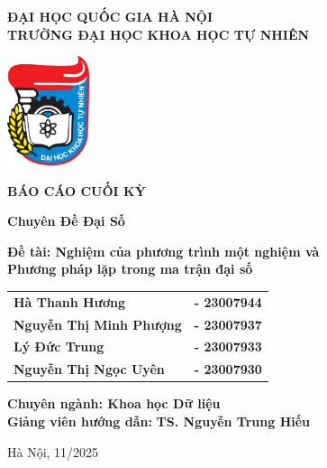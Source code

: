 \thispagestyle{empty}


\begin{center}
  \vspace{1.2cm}
  \textbf{ĐẠI HỌC QUỐC GIA HÀ NỘI} \\[0.2cm]
  \textbf{\fontsize{14pt}{17pt}\selectfont TRƯỜNG ĐẠI HỌC KHOA HỌC TỰ NHIÊN}

  \vspace{1.2cm}
  \includegraphics[width=0.18\textwidth]{figures/hus_logo.jpg}

  \vspace{1.2cm}
  {\bfseries\fontsize{35pt}{33pt}\selectfont BÁO CÁO CUỐI KỲ}

  \vspace{0.5cm}
  {\bfseries\fontsize{22pt}{26pt}\selectfont Chuyên Đề Đại Số}

  \vspace{0.8cm}
  \parbox{\dimexpr\textwidth - 1.2cm\relax}{
    \centering
    \textbf{\fontsize{18pt}{25pt}\selectfont
      Đề tài: Nghiệm của phương trình một nghiệm và\\
      Phương pháp lặp trong ma trận đại số}
  }

  \vspace{1.6cm}
  \renewcommand{\arraystretch}{1.2}
  \begin{tabular}{@{}l l@{}}
    \textbf{\fontsize{14pt}{17pt}Hà Thanh Hương}         & \textbf{\fontsize{14pt}{17pt}- 23007944} \\[-0.2em]
    \textbf{\fontsize{14pt}{17pt}Nguyễn Thị Minh Phượng} & \textbf{\fontsize{14pt}{17pt}- 23007937} \\[-0.2em]
    \textbf{\fontsize{14pt}{17pt}Lý Đức Trung}           & \textbf{\fontsize{14pt}{17pt}- 23007933} \\[-0.2em]
    \textbf{\fontsize{14pt}{17pt}Nguyễn Thị Ngọc Uyên}   & \textbf{\fontsize{14pt}{17pt}- 23007930}
  \end{tabular}
  \renewcommand{\arraystretch}{1}

  \vspace{0.8cm}
  \textbf{Chuyên ngành: Khoa học Dữ liệu} \\

  \vspace{1.6cm}
  \textbf{Giảng viên hướng dẫn:} \textbf{TS. Nguyễn Trung Hiếu}

  \vspace{2cm}
  \fontsize{14pt}{17pt}\selectfont Hà Nội, 11/2025
\end{center}

\cleardoublepage
